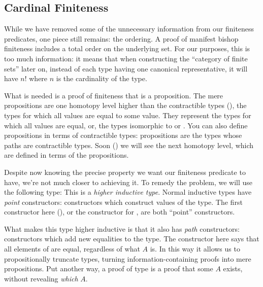 \subsection{Cardinal Finiteness}\label{cardinal-finiteness}
While we have removed some of the unnecessary information from our finiteness
predicates, one piece still remains: the ordering.
A proof of manifest bishop finiteness includes a total order on the underlying
set.
For our purposes, this is too much information: it means that when constructing
the ``category of finite sets'' later on, instead of each type having one
canonical representative, it will have $n!$ where $n$ is the cardinality of
the type.\footnotemark


What is needed is a proof of finiteness that is a proposition.
The mere propositions are one homotopy level higher than the contractible types
(), the types for which all values are equal to some value.
They represent the types for which all values are equal, or, the types
isomorphic to \agdabot\;or \agdatop.
You can also define propositions in terms of contractible types: propositions are
the types whose paths are contractible types.
Soon () we will see the next homotopy level, which are
defined in terms of the propositions.

Despite now knowing the precise property we want our finiteness predicate to
have, we're not much closer to achieving it.
To remedy the problem, we will use the following type:
This is a \emph{higher inductive type}.
Normal inductive types have \emph{point} constructors: constructors which
construct values of the type.
The first constructor here (\AgdaInductiveConstructor{\ensuremath{\lvert \_
    \rvert}}), or the constructor  for
, are both ``point'' constructors.

What makes this type higher inductive is that it also has \emph{path}
constructors: constructors which add new equalities to the type. 
The  constructor here says that all elements of
are equal, regardless of what \(A\) is.
In this way it allows us to propositionally truncate types, turning
information-containing proofs into mere propositions.
Put another way, a proof of type 
is a proof that some \(A\) exists, without revealing \emph{which} \(A\).

